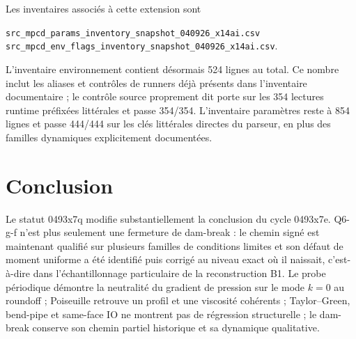 \documentclass[11pt,a4paper]{article}
\begin{document}
Les inventaires associés à cette extension sont
\begin{center}
\small
\nolinkurl{src_mpcd_params_inventory_snapshot_040926_x14ai.csv}\\
\nolinkurl{src_mpcd_env_flags_inventory_snapshot_040926_x14ai.csv}.
\end{center}
L'inventaire environnement contient désormais 524 lignes au total. Ce nombre inclut les aliases et contrôles de runners déjà présents dans l'inventaire documentaire ; le contrôle source proprement dit porte sur les 354 lectures runtime préfixées littérales et passe 354/354. L'inventaire paramètres reste à 854 lignes et passe 444/444 sur les clés littérales directes du parseur, en plus des familles dynamiques explicitement documentées.


\section{Conclusion}

Le statut 0493x7q modifie substantiellement la conclusion du cycle 0493x7e. Q6-g-f n'est plus seulement une fermeture de dam-break : le chemin signé est maintenant qualifié sur plusieurs familles de conditions limites et son défaut de moment uniforme a été identifié puis corrigé au niveau exact où il naissait, c'est-à-dire dans l'échantillonnage particulaire de la reconstruction B1. Le probe périodique démontre la neutralité du gradient de pression sur le mode $k=0$ au roundoff ; Poiseuille retrouve un profil et une viscosité cohérents ; Taylor--Green, bend-pipe et same-face IO ne montrent pas de régression structurelle ; le dam-break conserve son chemin partiel historique et sa dynamique qualitative.
\end{document}
